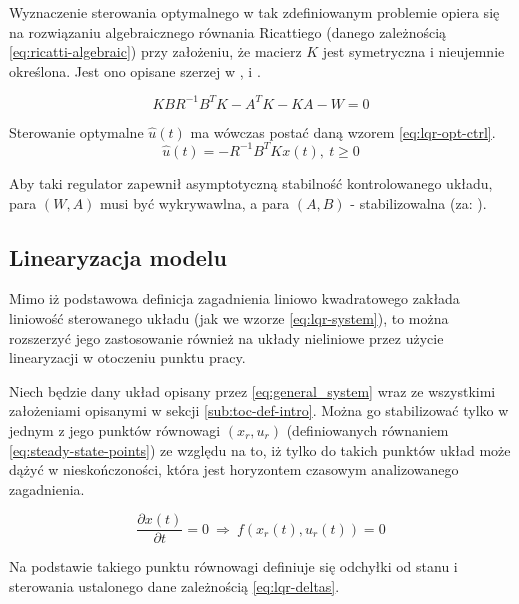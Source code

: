Wyznaczenie sterowania optymalnego w tak zdefiniowanym problemie opiera się na rozwiązaniu algebraicznego równania Ricattiego (danego zależnością \ref{eq:ricatti-algebraic}) przy założeniu, że macierz $K$ jest symetryczna i nieujemnie określona. Jest ono opisane szerzej w \cite{AthansOptCtrl}, \cite{Korytowski2015} i \cite{Murray2006}.

\begin{equation}\label{eq:ricatti-algebraic}
KBR^{-1}B^{T}K - A^{T}K - KA - W =0
\end{equation}

Sterowanie optymalne $\hat{u}(t)$ ma wówczas postać daną wzorem \ref{eq:lqr-opt-ctrl}.
\begin{equation}\label{eq:lqr-opt-ctrl}
\hat{u}(t) = -R^{-1}B^{T}Kx(t),~ t \geq 0
\end{equation}

Aby taki regulator zapewnił asymptotyczną stabilność kontrolowanego układu, para $(W, A)$ musi być wykrywawlna, a para $(A, B)$ - stabilizowalna (za: \cite{Korytowski2015}).

\subsection{Linearyzacja modelu}
\label{sub:lqr-lin}

Mimo iż podstawowa definicja zagadnienia liniowo kwadratowego zakłada liniowość sterowanego układu (jak we wzorze \ref{eq:lqr-system}), to można rozszerzyć jego zastosowanie również na układy nieliniowe przez użycie linearyzacji w otoczeniu punktu pracy.

Niech będzie dany układ opisany przez \ref{eq:general_system} wraz ze wszystkimi założeniami opisanymi w sekcji \ref{sub:toc-def-intro}.
Można go stabilizować tylko w jednym z jego punktów równowagi $(x_{r}, u_{r})$ (definiowanych równaniem \ref{eq:steady-state-points}) ze względu na to, iż tylko do takich punktów układ może dążyć w nieskończoności, która jest horyzontem czasowym analizowanego zagadnienia.

\begin{equation}\label{eq:steady-state-points}
\frac{\partial x(t)}{\partial t} = 0 ~\Rightarrow~ f(x_{r}(t), u_{r}(t)) = 0
\end{equation}

Na podstawie takiego punktu równowagi definiuje się odchyłki od stanu i sterowania ustalonego dane zależnością \ref{eq:lqr-deltas}.


